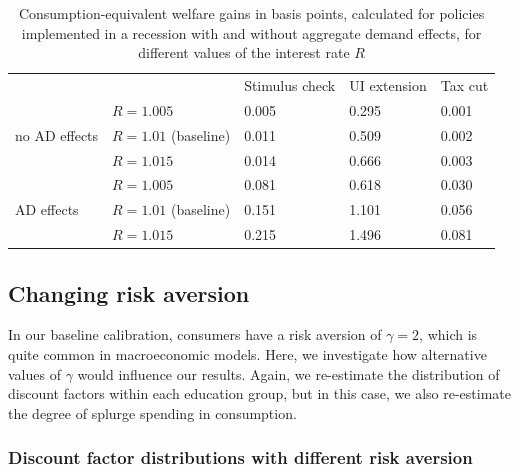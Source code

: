 \documentclass[\econtexRoot/HAFiscal]{subfiles}
\begin{document}
\begin{table}[t]
	\begin{center}
		\begin{tabular}{@{}lllll@{}}
			\toprule
			&                    & Stimulus check & UI extension & Tax cut \\ \cmidrule(l){1-5} 
			\multirow{3}{*}{no AD effects}            	& $R = 1.005$ 			& 0.005        & 0.295       & 0.001	\\
			& $R = 1.01$ (baseline) & 0.011        & 0.509       & 0.002   	\\
			& $R = 1.015$ 			& 0.014        & 0.666       & 0.003   	\\ \cmidrule(l){1-5}
			\multirow{3}{*}{AD effects}					& $R = 1.005$    		& 0.081        & 0.618       & 0.030  	\\		
			& $R = 1.01$ (baseline) & 0.151        & 1.101       & 0.056   	\\
			& $R = 1.015$    		& 0.215        & 1.496       & 0.081    \\ \cmidrule(l){1-5} 
		\end{tabular}
		\caption{Consumption-equivalent welfare gains in basis points, calculated for policies implemented in a recession with and without aggregate demand effects, for different values of the interest rate $R$}
		\notinsubfile{\label{tab:robustness_R_results}}
	\end{center}
\end{table}


\FloatBarrier
\hypertarget{changing-risk-aversion}{}\par\subsection{Changing risk aversion} 
\notinsubfile{\label{sec:robust_gamma}} 

In our baseline calibration, consumers have a risk aversion of $\gamma=2$, which is quite common in macroeconomic models. Here, we investigate how alternative values of $\gamma$ would influence our results. Again, we re-estimate the distribution of discount factors within each education group, but in this case, we also re-estimate the degree of splurge spending in consumption. 

\subsubsection{Discount factor distributions with different risk aversion}
\notinsubfile{\label{sec:robust_gamma_estim}}
\end{document}

